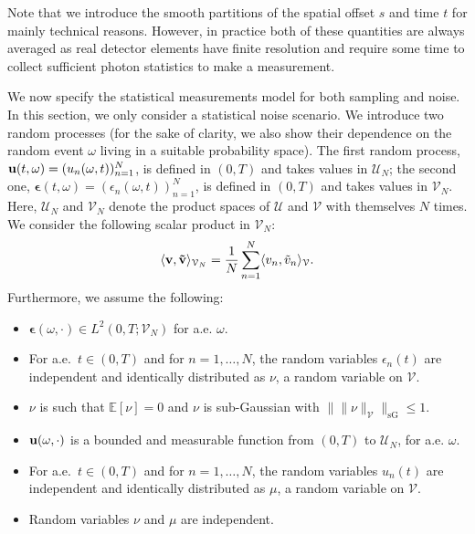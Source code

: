 \documentclass[11pt,a4paper]{article}
\numberwithin{equation}{section}
\newcounter{MotEx}
\renewcommand{\vec}[1]{\boldsymbol{#1}} %
\newcommand{\bu}{{\bf u}}
\newcommand{\be}{{\vec{\epsilon}}}
\newcommand{\E}{\mathbb{E}}
\begin{document}
\begin{MotExample}
Note that we introduce the smooth partitions of the spatial offset $s$ and time $t$ for mainly technical reasons. However, in practice both of these quantities are always averaged as real detector elements have finite resolution and require some time to collect sufficient photon statistics to make a measurement.

\end{MotExample}


We now specify the statistical measurements model for both sampling and noise. In this section, we only consider a statistical noise scenario. We introduce two random processes (for the sake of clarity, we also show their dependence on the random event $\omega$ living in a suitable probability space). The first random process, $\bu(t,\omega) = (u_n(\omega,t))_{n=1}^N$, is defined in $(0,T)$ and takes values in $\mathcal{U}_N$; the second one, $\be(t,\omega) = (\epsilon_n(\omega,t))_{n=1}^N$, is defined in $(0,T)$ and takes values in $\mathcal{V}_N$. Here, $\mathcal{U}_N$ and $\mathcal{V}_N$ denote the product spaces of $\mathcal{U}$ and $\mathcal{V}$ with themselves $N$ times. We consider the following scalar product in $\mathcal{V}_N$:
\[ \langle {\bf{v}}, {\bf{\tilde{v}}} \rangle_{\mathcal{V}_N} = \frac{1}{N} \sum_{n=1}^N \langle v_n, \tilde{v}_n \rangle_{\mathcal{V}}. \]
Furthermore, we assume the following:
\begin{itemize}
    \item[(M1)] $\be(\omega,\cdot) \in L^2(0,T;\mathcal{V}_N)$ for a.e. $\omega$.
    \item[(M2)] For a.e.~$t \in (0,T)$ and for $n = 1,\ldots,N$, the random variables $\epsilon_n(t)$ are independent and identically distributed as $\nu$, a random variable on $\mathcal{V}$.
    \item[(M3)] $\nu$ is such that $\E[\nu] = 0$ and $\nu$ is sub-Gaussian with $\big\|\| \nu\|_{\mathcal{V}}\big\|_{\text{sG}} \leq 1$.
    \item[(M4)] $\bu(\omega,\cdot)$ is a bounded and measurable function from $(0,T)$ to $\mathcal{U}_N$, for a.e. $\omega$.
    \item[(M5)] For a.e.~$t \in (0,T)$ and for $n = 1,\ldots,N$, the random variables $u_n(t)$ are independent and identically distributed as $\mu$, a random variable on $\mathcal{V}$.
    \item[(M6)] Random variables $\nu$ and $\mu$ are independent.
\end{itemize}
\end{document}
